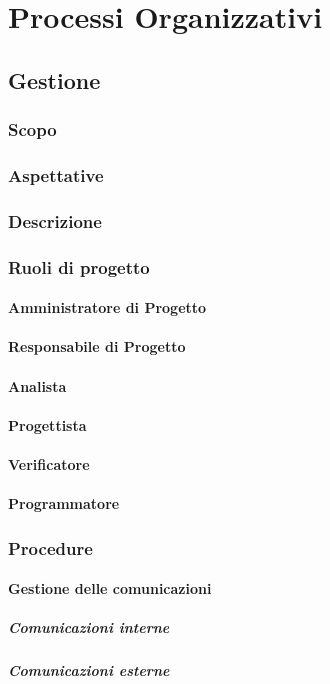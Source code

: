 \section{Processi Organizzativi}


\subsection{Gestione}

	\subsubsection{Scopo}
	\subsubsection{Aspettative}
	\subsubsection{Descrizione}
	\subsubsection{Ruoli di progetto}
		\paragraph{Amministratore di Progetto}
		\paragraph{Responsabile di Progetto}
		\paragraph{Analista}
		\paragraph{Progettista}
		\paragraph{Verificatore}
		\paragraph{Programmatore}
	\subsubsection{Procedure}
		\paragraph{Gestione delle comunicazioni}
			\subparagraph{Comunicazioni interne}
			\subparagraph{Comunicazioni esterne}
